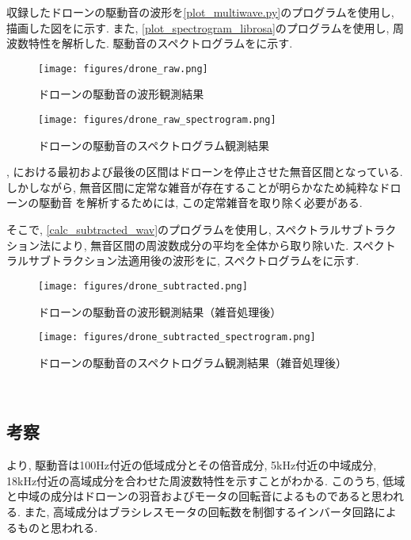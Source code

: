 収録したドローンの駆動音の波形を\ref{plot_multiwave.py}のプログラムを使用し, 描画した図をに示す. また, \ref{plot_spectrogram_librosa}のプログラムを使用し, 周波数特性を解析した. 駆動音のスペクトログラムをに示す. 

\begin{figure}[H]
\centering
\texttt{[image: figures/drone\_raw.png]}
\caption{ドローンの駆動音の波形観測結果}
\label{fig:drone_raw}
\end{figure}

\begin{figure}[H]
\centering
\texttt{[image: figures/drone\_raw\_spectrogram.png]}
\caption{ドローンの駆動音のスペクトログラム観測結果}
\label{fig:drone_raw_spectrogram}
\end{figure}

, における最初および最後の区間はドローンを停止させた無音区間となっている. しかしながら, 無音区間に定常な雑音が存在することが明らかなため純粋なドローンの駆動音を解析するためには, この定常雑音を取り除く必要がある. 

そこで, \ref{calc_subtracted_wav}のプログラムを使用し, スペクトラルサブトラクション法\cite{spectral_subtraction}により, 無音区間の周波数成分の平均を全体から取り除いた. 
スペクトラルサブトラクション法適用後の波形をに, スペクトログラムをに示す. 

\begin{figure}[H]
\centering
\texttt{[image: figures/drone\_subtracted.png]}
\caption{ドローンの駆動音の波形観測結果（雑音処理後）}
\label{fig:drone_subtracted}
\end{figure}

\begin{figure}[H]
\centering
\texttt{[image: figures/drone\_subtracted\_spectrogram.png]}
\caption{ドローンの駆動音のスペクトログラム観測結果（雑音処理後）}
\label{fig:drone_subtracted_spectrogram}
\end{figure}


\
\subsection{考察}\label{consideration-drone}

より, 駆動音は100Hz付近の低域成分とその倍音成分, 5kHz付近の中域成分, 18kHz付近の高域成分を合わせた周波数特性を示すことがわかる. このうち, 低域と中域の成分はドローンの羽音およびモータの回転音によるものであると思われる. また, 高域成分はブラシレスモータの回転数を制御するインバータ回路によるものと思われる. 

